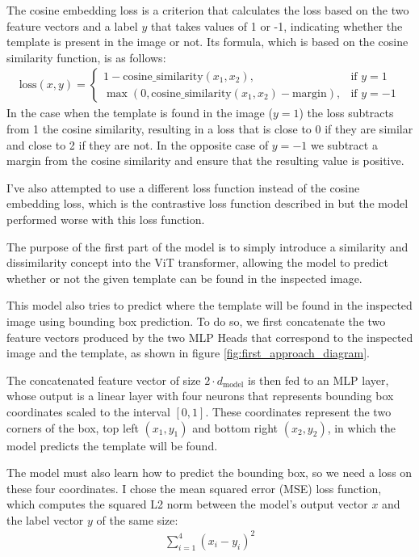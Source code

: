 \documentclass{report}[12pt, a4paper]
\begin{document}
The cosine embedding loss is a criterion that calculates the loss based on the two feature vectors and a label $y$ that takes values of 1 or -1, indicating whether the template is present in the image or not. Its formula, which is based on the cosine similarity function, is as follows:
\begin{align*}
    \text{loss}(x, y) =
        \begin{cases}
        1 - \text{cosine\_similarity}\left(x_1, x_2\right), & \text{if } y = 1 \\
        \max(0, \text{cosine\_similarity}\left(x_1, x_2\right) - \text{margin}), & \text{if } y = -1
        \end{cases}
\end{align*}
In the case when the template is found in the image ($y=1$) the loss subtracts from 1 the cosine similarity, resulting in a loss that is close to 0 if they are similar and close to 2 if they are not. In the opposite case of $y=-1$ we subtract a margin from the cosine similarity and ensure that the resulting value is positive.

I've also attempted to use a different loss function instead of the cosine embedding loss, which is the contrastive loss function described in \cite{contrastive_loss_paper} but the model performed worse with this loss function.

The purpose of the first part of the model is to simply introduce a similarity and dissimilarity concept into the ViT transformer, allowing the model to predict whether or not the given template can be found in the inspected image.

This model also tries to predict where the template will be found in the inspected image using bounding box prediction. To do so, we first concatenate the two feature vectors produced by the two MLP Heads that correspond to the inspected image and the template, as shown in figure \ref{fig:first_approach_diagram}.

The concatenated feature vector of size $2\cdot d_{\text{model}}$ is then fed to an MLP layer, whose output is a linear layer with four neurons that represents bounding box coordinates scaled to the interval $\left[0,1\right]$. These coordinates represent the two corners of the box, top left $\left(x_1,y_1\right)$ and bottom right $\left(x_2,y_2\right)$, in which the model predicts the template will be found.

The model must also learn how to predict the bounding box, so we need a loss on these four coordinates. I chose the mean squared error (MSE) loss function, which computes the squared L2 norm between the model's output vector $x$ and the label vector $y$ of the same size:
\begin{align*}
    \sum_{i=1}^{4}(x_i-y_i)^2
\end{align*}
\end{document}
